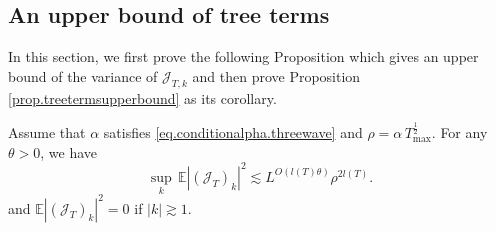 \subsection{An upper bound of tree terms}\label{sec.treetermsupperbound} In this section, we first prove the following Proposition which gives an upper bound of the variance of $\mathcal{J}_{T,k}$ and then prove Proposition \ref{prop.treetermsupperbound} as its corollary.

\begin{prop}\label{prop.treetermsvariance}
Assume that $\alpha$ satisfies \eqref{eq.conditionalpha.threewave} and $\rho=\alpha\, T^{\frac{1}{2}}_{\text{max}}$. For any $\theta>0$, we have
\begin{equation}
    \sup_k\, \mathbb{E}|(\mathcal{J}_T)_k|^2\lesssim L^{O(l(T)\theta)} \rho^{2l(T)}.
\end{equation}
and $\mathbb{E}|(\mathcal{J}_T)_k|^2=0$ if $|k|\gtrsim 1$.
\end{prop}
